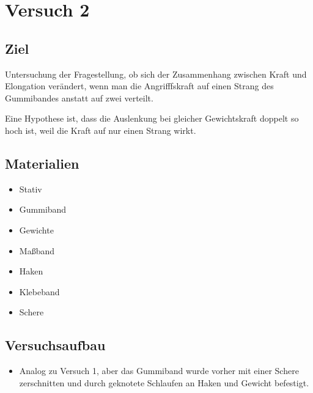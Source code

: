 \documentclass[class=article, crop=false]{standalone}
\providecommand{\tightlist}{%
  \setlength{\itemsep}{0pt}\setlength{\parskip}{0pt}}
\begin{document}
\hypertarget{versuch-2}{%
\section{Versuch 2}\label{versuch-2}}

\hypertarget{ziel-1}{%
\subsection{Ziel}\label{ziel-1}}

Untersuchung der Fragestellung, ob sich der Zusammenhang zwischen Kraft
und Elongation verändert, wenn man die Angrifffskraft auf einen Strang
des Gummibandes anstatt auf zwei verteilt.

Eine Hypothese ist, dass die Auslenkung bei gleicher Gewichtskraft
doppelt so hoch ist, weil die Kraft auf nur einen Strang wirkt.

\hypertarget{materialien-1}{%
\subsection{Materialien}\label{materialien-1}}

\begin{itemize}
\tightlist
\item
  Stativ
\item
  Gummiband
\item
  Gewichte
\item
  Maßband
\item
  Haken
\item
  Klebeband
\item
  Schere
\end{itemize}

\hypertarget{versuchsaufbau-1}{%
\subsection{Versuchsaufbau}\label{versuchsaufbau-1}}

\begin{itemize}
\tightlist
\item
  Analog zu Versuch 1, aber das Gummiband wurde vorher mit einer Schere
  zerschnitten und durch geknotete Schlaufen an Haken und Gewicht
  befestigt.
\end{itemize}
\end{document}
